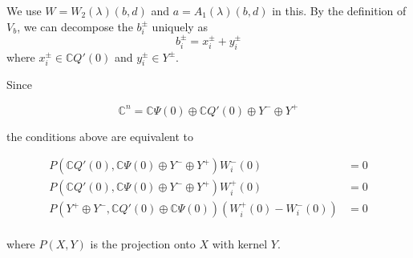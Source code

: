 \documentclass[12pt]{article}
\def\C{{\mathbb C}}
\begin{document}
We use $W = W_2(\lambda)(b,d)$ and $a = A_1(\lambda)(b,d)$ in this. By the definition of $V_b$, we can decompose the $b_i^\pm$ uniquely as
\[
b_i^\pm = x_i^\pm + y_i^\pm
\]
where $x_i^\pm \in \C Q'(0)$ and $y_i^\pm \in Y^\pm$. 

Since

\[
\C^n = \C\Psi(0) \oplus \C Q'(0) \oplus Y^- \oplus Y^+
\]

the conditions above are equivalent to

\begin{align*}\label{projeq}
P(\C Q'(0), \C\Psi(0) \oplus Y^- \oplus Y^+)W_i^-(0) &= 0 \\
P(\C Q'(0), \C\Psi(0) \oplus Y^- \oplus Y^+)W_i^+(0) &= 0 \\
P(Y^+ \oplus Y^-, \C Q'(0) \oplus \C\Psi(0) )(W_i^+(0) - W_i^-(0)) &= 0 \\
\end{align*}

where $P(X,Y)$ is the projection onto $X$ with kernel $Y$.
\end{document}
